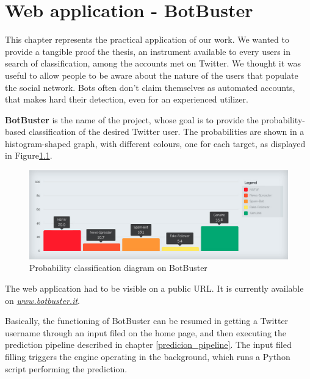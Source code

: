 \chapter{Web application - BotBuster}
\label{capitolo6}
\thispagestyle{empty}
This chapter represents the practical application of our work. We wanted to provide a tangible proof the thesis, an instrument available to every users in search of classification, among the accounts met on Twitter.
We thought it was useful to allow people to be aware about the nature of the users that populate the social network.
Bots often don't claim themselves as automated accounts, that makes hard their detection, even for an experienced utilizer.


\textbf{BotBuster} is the name of the project, whose goal is to provide the probability-based classification of the desired Twitter user.
The probabilities are shown in a histogram-shaped graph, with different colours, one for each target, as displayed in Figure\ref{fig:histogram}.

\begin{figure}
	\begin{center}
		\includegraphics[width=\columnwidth]{chapter6/figure/histogram.jpg}\par 
	\end{center}
	\caption{Probability classification diagram on BotBuster}
	\label{fig:histogram}
\end{figure}

The web application had to be visible on a public URL. It is currently available on \href{http://www.botbuster.it}{\textit{www.botbuster.it}}.

Basically, the functioning of BotBuster can be resumed in getting a Twitter username through an input filed on the home page, and then executing the prediction pipeline described in chapter \ref{predicion_pipeline}.
The input filed filling triggers the engine operating in the background, which runs a Python script performing the prediction.
